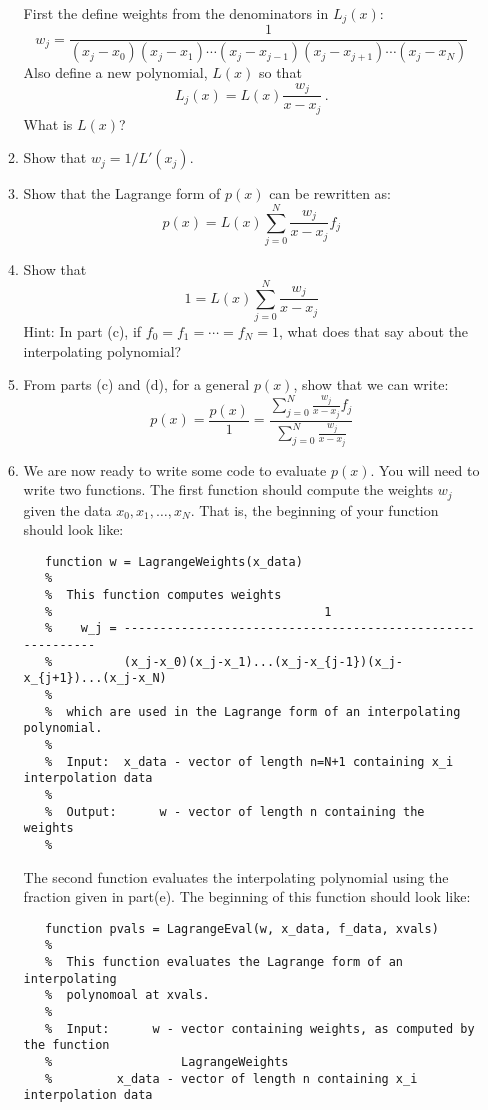 \documentclass[12pt]{article}
\begin{document}
\begin{enumerate}
\begin{enumerate}
First the define weights from the denominators in $L_j(x)$:
$$
  w_j = \frac{1}{(x_j-x_0)(x_j-x_1)\cdots(x_j-x_{j-1})(x_j-x_{j+1})\cdots(x_j-x_N)}
$$
Also define a new polynomial, $L(x)$ so that 
$$
  L_j(x) = L(x) \frac{w_j}{x-x_j}\,.
$$
What is $L(x)$?
\item
Show that $w_j = 1/L'(x_j)$.
\item
Show that the Lagrange form of $p(x)$ can be rewritten as:
$$
  p(x) = L(x)\sum_{j=0}^N \frac{w_j}{x-x_j}f_j
$$
\item
Show that
$$
  1 = L(x)\sum_{j=0}^N \frac{w_j}{x-x_j}
$$
Hint: In part (c), if $f_0 = f_1 = \cdots = f_N = 1$, what does that say about the 
interpolating polynomial?
\item
From parts (c) and (d), for a general $p(x)$, show that we can write:
$$
  p(x) = \frac{p(x)}{1} = \frac{\displaystyle \sum_{j=0}^N \frac{w_j}{x-x_j}f_j}{\displaystyle \sum_{j=0}^N \frac{w_j}{x-x_j}}
$$
\item
We are now ready to write some code to evaluate $p(x)$.  You will need to write two functions.  The
first function should compute the weights $w_j$ given the data $x_0, x_1, \ldots, x_N$.  That is,
the beginning of your function should look like:
\vspace*{12pt}
{\footnotesize
\begin{verbatim}
   function w = LagrangeWeights(x_data)
   %
   %  This function computes weights 
   %                                      1
   %    w_j = -----------------------------------------------------------
   %          (x_j-x_0)(x_j-x_1)...(x_j-x_{j-1})(x_j-x_{j+1})...(x_j-x_N)
   %
   %  which are used in the Lagrange form of an interpolating polynomial.
   %
   %  Input:  x_data - vector of length n=N+1 containing x_i interpolation data
   % 
   %  Output:      w - vector of length n containing the weights
   %
\end{verbatim}
}
\vspace*{12pt}
The second function evaluates the interpolating polynomial using the fraction given
in part(e).  The beginning of this function should look like:
\vspace*{12pt}
{\footnotesize
\begin{verbatim}
   function pvals = LagrangeEval(w, x_data, f_data, xvals)
   %
   %  This function evaluates the Lagrange form of an interpolating
   %  polynomoal at xvals.
   % 
   %  Input:      w - vector containing weights, as computed by the function
   %                  LagrangeWeights
   %         x_data - vector of length n containing x_i interpolation data

\end{verbatim}}
\end{enumerate}
\end{enumerate}
\end{document}
